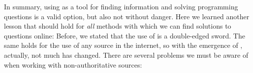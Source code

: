 In summary, using  as a tool for finding information and solving programming questions is a valid option, but also not without danger.
Here we learned another lesson that should hold for \emph{all} methods with which we can find solutions to questions online:%
%
%
%
Before, we stated that the use of  is a double-edged sword.
The same holds for the use of any source in the internet, so with the emergence of , actually, not much has changed.
There are several problems we must be aware of when working with non-authoritative sources:%
%

